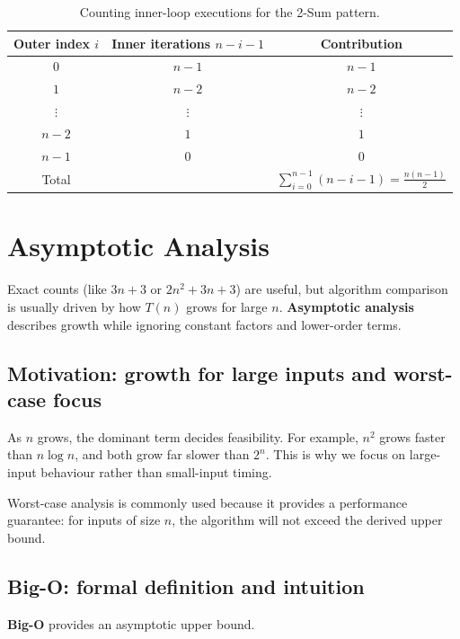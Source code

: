 \documentclass[12pt]{scrartcl}
\begin{document}
\begin{table}[h]
	\centering
	\caption{Counting inner-loop executions for the 2-Sum pattern.}
	\begin{tabular}{@{}c c c@{}}
		\toprule
		Outer index \(i\) & Inner iterations \(n-i-1\) & Contribution                                  \\ \midrule
		\(0\)             & \(n-1\)                    & \(n-1\)                                       \\
		\(1\)             & \(n-2\)                    & \(n-2\)                                       \\
		\(\vdots\)        & \(\vdots\)                 & \(\vdots\)                                    \\
		\(n-2\)           & \(1\)                      & \(1\)                                         \\
		\(n-1\)           & \(0\)                      & \(0\)                                         \\ \midrule
		Total             &                            & \(\sum_{i=0}^{n-1} (n-i-1)=\frac{n(n-1)}{2}\) \\
		\bottomrule
	\end{tabular}
\end{table}


\section{Asymptotic Analysis}
Exact counts (like \(3n+3\) or \(2n^2+3n+3\)) are useful, but algorithm comparison is usually driven by how \(T(n)\) grows for large \(n\). \textbf{Asymptotic analysis} describes growth while ignoring constant factors and lower-order terms.

\subsection{Motivation: growth for large inputs and worst-case focus}
As \(n\) grows, the dominant term decides feasibility. For example, \(n^2\) grows faster than \(n\log n\), and both grow far slower than \(2^n\). This is why we focus on large-input behaviour rather than small-input timing.

Worst-case analysis is commonly used because it provides a performance guarantee: for inputs of size \(n\), the algorithm will not exceed the derived upper bound.

\subsection{Big-O: formal definition and intuition}
\textbf{Big-O} provides an asymptotic upper bound.
\end{document}
